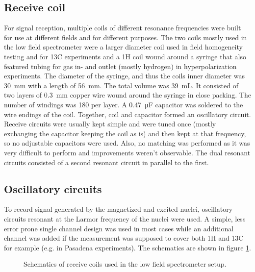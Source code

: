         \subsection{Receive coil}
        \label{sec:matMeth:receiveCoil}
        For signal reception, multiple coils of different resonance frequencies were built for use at different fields and for different purposes. The two coils mostly used in the low field spectrometer were a larger diameter coil used in field homogeneity testing and for 13C experiments and a 1H coil wound around a syringe that also featured tubing for gas in- and outlet (mostly hydrogen) in hyperpolarization experiments. The diameter of the syringe, and thus the coils inner diameter was \SI{30}{\mm} with a length of \SI{56}{\milli\meter}. The total volume was \SI{39}{\milli\liter}. It consisted of two layers of \SI{0.3}{\milli\meter} copper wire wound around the syringe in close packing. The number of windings was 180 per layer. A \SI{0.47}{\micro\farad} capacitor was soldered to the wire endings of the coil. Together, coil and capacitor formed an oscillatory circuit. 
        Receive circuits were usually kept simple and were tuned once (mostly exchanging the capacitor keeping the coil as is) and then kept at that frequency, so no adjustable capacitors were used. Also, no matching was performed as it was very difficult to perform and improvements weren't observable. The dual resonant circuits consisted of a second resonant circuit in parallel to the first.
        \subsection{Oscillatory circuits}
        \label{sec:matMeth:oscillatoryCircuits}
        To record signal generated by the magnetized and excited nuclei, oscillatory circuits resonant at the Larmor frequency of the nuclei were used. A simple, less error prone single channel design was used in most cases while an additional channel was added if the measurement was supposed to cover both 1H and 13C for example (e.g. in Pasadena experiments). The schematics are shown in figure \ref{fig:matMeth:oscillatoryCircuits}.
        \begin{figure}
            \label{fig:matMeth:oscillatoryCircuits}
            \caption{Schematics of receive coils used in the low field spectrometer setup.}
        \end{figure}

